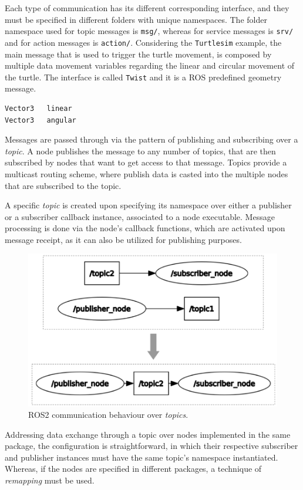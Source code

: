 Each type of communication has its different corresponding interface, and they must be specified in different folders with unique namespaces. The folder namespace used for topic messages is \texttt{msg/}, whereas for service messages is \texttt{srv/} and for action messages is \texttt{action/}. Considering the \texttt{Turtlesim} example, the main message that is used to trigger the turtle movement, is composed by multiple data movement variables regarding the linear and circular movement of the turtle. The interface is called \texttt{Twist} and it is a ROS predefined geometry message.

\begin{lstlisting}[title={\texttt{Twist.msg} interface file that is used to trigger the turtle movement.}]
Vector3   linear
Vector3   angular
\end{lstlisting}

Messages are passed through via the pattern of publishing and subscribing over a \textit{topic}. A node publishes the message to any number of topics, that are then subscribed by nodes that want to get access to that message. Topics provide a multicast routing scheme, where publish data is casted into the multiple nodes that are subscribed to the topic. 

A specific \textit{topic} is created upon specifying its namespace over either a publisher or a subscriber callback instance, associated to a node executable. Message processing is done via the node's callback functions, which are activated upon message receipt, as it can also be utilized for publishing purposes. \cite{casini2019response} %

\begin{figure}[H]
        \centering
        \includegraphics[width=0.4\linewidth]{images/ros2-topics.png}
        \caption{ROS2 communication behaviour over \textit{topics}.}
        \label{fig:ros2-topics}
\end{figure}

Addressing data exchange through a topic over nodes implemented in the same package, the configuration is straightforward, in which their respective subscriber and publisher instances must have the same topic's namespace instantiated. Whereas, if the nodes are specified in different packages, a technique of \textit{remapping} must be used.

